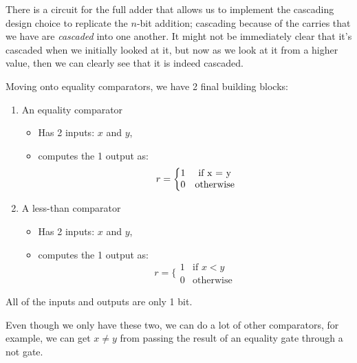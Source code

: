 \documentclass[11pt,a4paper,titlepage,dvipsnames,cmyk]{scrartcl}
\begin{document}
There is a circuit for the full adder that allows us to implement the
cascading design choice to replicate the $n$-bit addition; cascading
because of the carries that we have are \textit{cascaded} into one
another. It might not be immediately clear that it's cascaded when we
initially looked at it, but now as we look at it from a higher value, then
we can clearly see that it is indeed cascaded.


Moving onto equality comparators, we have 2 final building blocks:
\begin{enumerate}
    \item An equality comparator
        \begin{itemize}
            \item Has 2 inputs: $x$ and $y$,
            \item computes the 1 output as:
                \begin{equation*}
                    r = \bigg \{
                   \begin{matrix}
                       1 & \text{if } $x = y$ \\
                       0 & \text{otherwise}
                   \end{matrix}
                \end{equation*}
        \end{itemize}
    \item A less-than comparator
        \begin{itemize}
            \item Has 2 inputs: $x$ and $y$,
            \item computes the 1 output as:
                \begin{equation*}
                    r = \bigg \{
                        \begin{matrix}
                            1 & \text{if } x < y \\
                            0 & \text{otherwise}
                        \end{matrix}
                \end{equation*}
        \end{itemize}
\end{enumerate}

All of the inputs and outputs are only 1 bit.

Even though we only have these two, we can do a lot of other comparators,
for example, we can get $x \neq y$ from passing the result of an equality
gate through a not gate.
\end{document}
